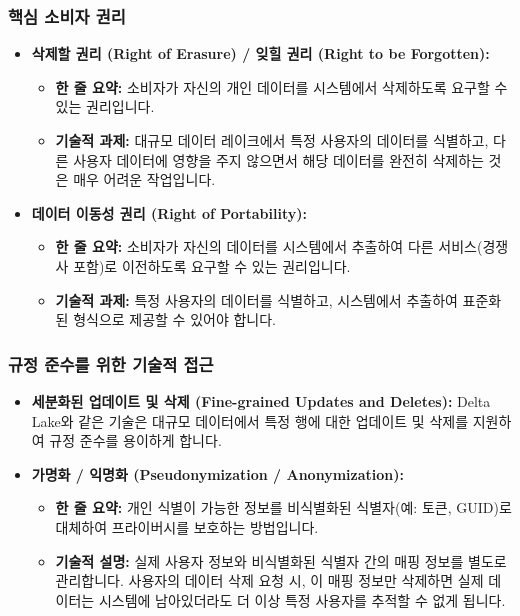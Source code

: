 \documentclass[11pt,a4paper]{article}
\begin{document}
\subsubsection{핵심 소비자 권리}
\begin{itemize}
    \item \textbf{삭제할 권리 (Right of Erasure) / 잊힐 권리 (Right to be Forgotten):}
    \begin{itemize}
        \item \textbf{한 줄 요약:} 소비자가 자신의 개인 데이터를 시스템에서 삭제하도록 요구할 수 있는 권리입니다.
        \item \textbf{기술적 과제:} 대규모 데이터 레이크에서 특정 사용자의 데이터를 식별하고, 다른 사용자 데이터에 영향을 주지 않으면서 해당 데이터를 완전히 삭제하는 것은 매우 어려운 작업입니다.
    \end{itemize}
    \item \textbf{데이터 이동성 권리 (Right of Portability):}
    \begin{itemize}
        \item \textbf{한 줄 요약:} 소비자가 자신의 데이터를 시스템에서 추출하여 다른 서비스(경쟁사 포함)로 이전하도록 요구할 수 있는 권리입니다.
        \item \textbf{기술적 과제:} 특정 사용자의 데이터를 식별하고, 시스템에서 추출하여 표준화된 형식으로 제공할 수 있어야 합니다.
    \end{itemize}
\end{itemize}

\subsubsection{규정 준수를 위한 기술적 접근}
\begin{itemize}
    \item \textbf{세분화된 업데이트 및 삭제 (Fine-grained Updates and Deletes):} Delta Lake와 같은 기술은 대규모 데이터에서 특정 행에 대한 업데이트 및 삭제를 지원하여 규정 준수를 용이하게 합니다.
    \item \textbf{가명화 / 익명화 (Pseudonymization / Anonymization):}
    \begin{itemize}
        \item \textbf{한 줄 요약:} 개인 식별이 가능한 정보를 비식별화된 식별자(예: 토큰, GUID)로 대체하여 프라이버시를 보호하는 방법입니다.
        \item \textbf{기술적 설명:} 실제 사용자 정보와 비식별화된 식별자 간의 매핑 정보를 별도로 관리합니다. 사용자의 데이터 삭제 요청 시, 이 매핑 정보만 삭제하면 실제 데이터는 시스템에 남아있더라도 더 이상 특정 사용자를 추적할 수 없게 됩니다.
    \end{itemize}
\end{itemize}
\end{document}
